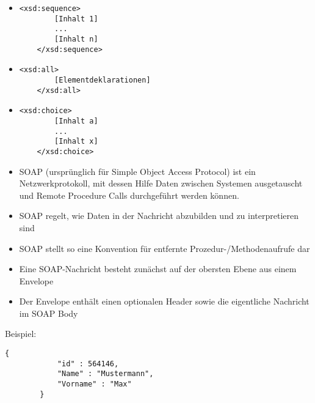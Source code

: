 \begin{itemize}
    \item
    \lstset{language=XML, breaklines=true}
    \begin{lstlisting}[label={lst:lstlisting7}]
    <xsd:sequence>
        [Inhalt 1]
        ...
        [Inhalt n]
    </xsd:sequence>
    \end{lstlisting}
    \item
    \lstset{language=XML, breaklines=true}
    \begin{lstlisting}[label={lst:lstlisting8}]
    <xsd:all>
        [Elementdeklarationen]
    </xsd:all>
    \end{lstlisting}
    \item
    \lstset{language=XML, breaklines=true}
    \begin{lstlisting}[label={lst:lstlisting9}]
    <xsd:choice>
        [Inhalt a]
        ...
        [Inhalt x]
    </xsd:choice>
    \end{lstlisting}
\end{itemize}

\begin{itemize}
    \item SOAP (ursprünglich für Simple Object Access Protocol) ist ein Netzwerkprotokoll, mit dessen Hilfe Daten zwischen Systemen ausgetauscht und Remote Procedure Calls durchgeführt werden können.
    \item SOAP regelt, wie Daten in der Nachricht abzubilden und zu interpretieren sind
    \item SOAP stellt so eine Konvention für entfernte Prozedur-/Methodenaufrufe dar
    \item Eine SOAP-Nachricht besteht zunächst auf der obersten Ebene aus einem Envelope
    \item Der Envelope enthält einen optionalen Header sowie die eigentliche Nachricht im SOAP Body
\end{itemize}

Beispiel:
    \begin{lstlisting}[label={lst:lstlisting10}]
        {
            "id" : 564146,
            "Name" : "Mustermann",
            "Vorname" : "Max"
        }
    \end{lstlisting}